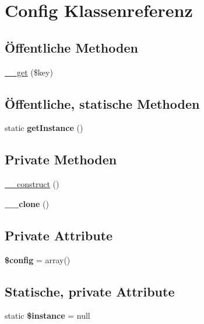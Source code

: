 \hypertarget{class_config}{\section{Config Klassenreferenz}
\label{class_config}
}
\subsection*{Öffentliche Methoden}
\begin{DoxyCompactItemize}
\item 
\hyperlink{class_config_aeb4233e287af07c75fff2d77e28a1eba}{\-\_\-\-\_\-get} (\$key)
\end{DoxyCompactItemize}
\subsection*{Öffentliche, statische Methoden}
\begin{DoxyCompactItemize}
\item 
\hypertarget{class_config_aef7aac9c02b60638561fe777a87a5673}{static {\bfseries get\-Instance} ()}\label{class_config_aef7aac9c02b60638561fe777a87a5673}

\end{DoxyCompactItemize}
\subsection*{Private Methoden}
\begin{DoxyCompactItemize}
\item 
\hyperlink{class_config_ac1c75b1b53a17a028629ba8127e06f82}{\-\_\-\-\_\-construct} ()
\item 
\hypertarget{class_config_aa84beb1afac47a0723dbfa5be7e6be72}{{\bfseries \-\_\-\-\_\-clone} ()}\label{class_config_aa84beb1afac47a0723dbfa5be7e6be72}

\end{DoxyCompactItemize}
\subsection*{Private Attribute}
\begin{DoxyCompactItemize}
\item 
\hypertarget{class_config_abdb13aa29fd63a731b31ba0e709c7faa}{{\bfseries \$config} = array()}\label{class_config_abdb13aa29fd63a731b31ba0e709c7faa}

\end{DoxyCompactItemize}
\subsection*{Statische, private Attribute}
\begin{DoxyCompactItemize}
\item 
\hypertarget{class_config_ac75489237154302980c51f1d1464d0af}{static {\bfseries \$instance} = null}\label{class_config_ac75489237154302980c51f1d1464d0af}

\end{DoxyCompactItemize}


